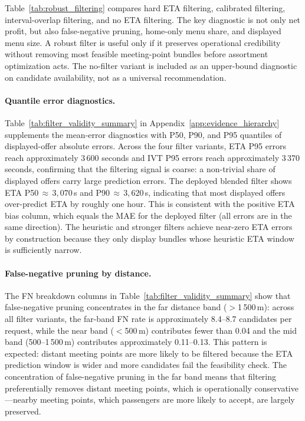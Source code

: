 Table~\ref{tab:robust_filtering} compares hard ETA filtering, calibrated filtering, interval-overlap filtering, and no ETA filtering. The key diagnostic is not only net profit, but also false-negative pruning, home-only menu share, and displayed menu size. A robust filter is useful only if it preserves operational credibility without removing most feasible meeting-point bundles before assortment optimization acts. The no-filter variant is included as an upper-bound diagnostic on candidate availability, not as a universal recommendation.

\paragraph{Quantile error diagnostics.}
Table~\ref{tab:filter_validity_summary} in Appendix~\ref{app:evidence_hierarchy} supplements the mean-error diagnostics with P50, P90, and P95 quantiles of displayed-offer absolute errors. Across the four filter variants, ETA P95 errors reach approximately 3\,600 seconds and IVT P95 errors reach approximately 3\,370 seconds, confirming that the filtering signal is coarse: a non-trivial share of displayed offers carry large prediction errors. The deployed blended filter shows ETA P50$\,{\approx}\,3{,}070$\,s and P90$\,{\approx}\,3{,}620$\,s, indicating that most displayed offers over-predict ETA by roughly one hour. This is consistent with the positive ETA bias column, which equals the MAE for the deployed filter (all errors are in the same direction). The heuristic and stronger filters achieve near-zero ETA errors by construction because they only display bundles whose heuristic ETA window is sufficiently narrow.

\paragraph{False-negative pruning by distance.}
The FN breakdown columns in Table~\ref{tab:filter_validity_summary} show that false-negative pruning concentrates in the far distance band ($>$1\,500\,m): across all filter variants, the far-band FN rate is approximately 8.4--8.7 candidates per request, while the near band ($<$500\,m) contributes fewer than 0.04 and the mid band (500--1\,500\,m) contributes approximately 0.11--0.13. This pattern is expected: distant meeting points are more likely to be filtered because the ETA prediction window is wider and more candidates fail the feasibility check. The concentration of false-negative pruning in the far band means that filtering preferentially removes distant meeting points, which is operationally conservative---nearby meeting points, which passengers are more likely to accept, are largely preserved.


